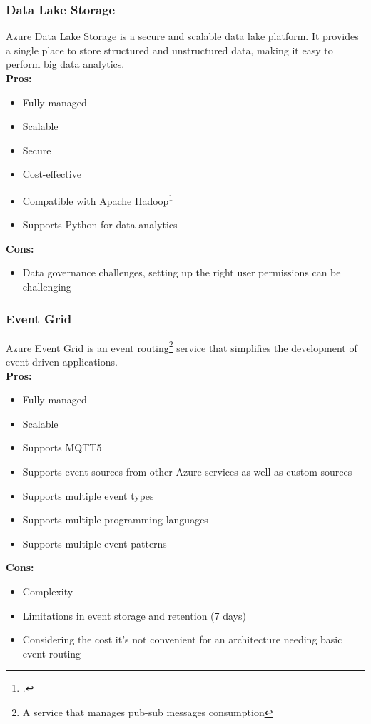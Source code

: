         \subsubsection{Data Lake Storage}
        \label{azure:data-lake-storage}
 Azure Data Lake Storage is a secure and scalable data lake platform. It provides a single place to store structured and unstructured data, making it easy to perform big data analytics.\\
        \textbf{Pros:}
        \begin{itemize}
            \item Fully managed
            \item Scalable
            \item Secure
            \item Cost-effective
            \item Compatible with Apache Hadoop\footcite{site:hadoop}
            \item Supports Python for data analytics
        \end{itemize}
        \textbf{Cons:}
        \begin{itemize}
            \item Data governance challenges, setting up the right user permissions can be challenging
        \end{itemize}

        \subsubsection{Event Grid}
        \label{azure:event-grid}
 Azure Event Grid is an event routing\footnote{A service that manages pub-sub messages consumption} service that simplifies the development of event-driven applications.\\
        \textbf{Pros:}
        \begin{itemize}
            \item Fully managed
            \item Scalable
            \item Supports MQTT5
            \item Supports event sources from other Azure services as well as custom sources
            \item Supports multiple event types
            \item Supports multiple programming languages
            \item Supports multiple event patterns
        \end{itemize}
        \textbf{Cons:}
        \begin{itemize}
            \item Complexity
            \item Limitations in event storage and retention (7 days)
            \item Considering the cost it's not convenient for an architecture needing basic event routing
        \end{itemize}

